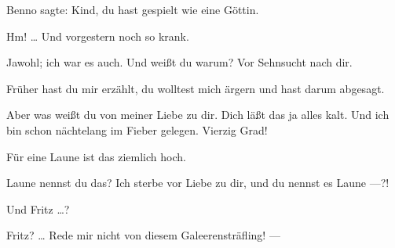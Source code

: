 \documentclass[
	final,
	a4paper,
	ngerman,
	mpinclude = true, %
	twoside = true,
	open = right,
	cleardoublepage = plain,
	DIV = 13,
	BCOR = 1cm,
	titlepage = firstiscover,
	]{scrbook}
\newcommand{\thecharacter}[1]{\textup{\textsc{#1}}}
\newcommand{\thedichter}{\thecharacter{Dichter}}
\newcommand{\theschauspielerin}{\thecharacter{Schauspielerin}}
\newcommand{\character}[1]{\item[#1:]}
\newcommand{\dichter}{\character{\thedichter}}
\newcommand{\schauspielerin}{\character{\theschauspielerin}}
\begin{document}
\begin{play}
	\schauspielerin
	Benno sagte: Kind, du hast gespielt wie eine Göttin.

	\dichter
	Hm! \ldots{} Und vorgestern noch so krank.

	\schauspielerin
	Jawohl; ich war es auch. Und weißt du warum? Vor Sehnsucht nach dir.

	\dichter
	Früher hast du mir erzählt, du wolltest mich ärgern und hast darum abgesagt.

	\schauspielerin
	Aber was weißt du von meiner Liebe zu dir. Dich läßt das ja alles kalt. Und ich bin schon nächtelang im Fieber gelegen. Vierzig Grad!

	\dichter
	Für eine Laune ist das ziemlich hoch.

	\schauspielerin
	Laune nennst du das? Ich sterbe vor Liebe zu dir, und du nennst es Laune ---?!

	\dichter
	Und Fritz \ldots{}?

	\schauspielerin
	Fritz? \ldots{} Rede mir nicht von diesem Galeerensträfling! ---

\end{play}
\end{document}
